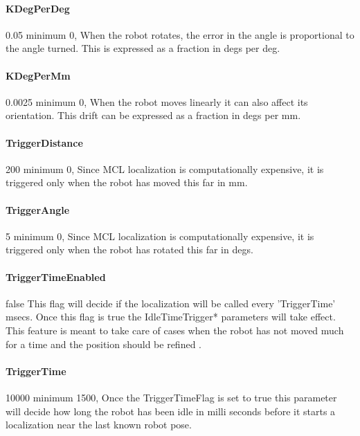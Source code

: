 \documentclass{article}
\begin{document}
\paragraph{KDegPerDeg}\label{KDegPerDegDoc} 0.05           minimum 0,  When the robot rotates, the error in the
                          angle is proportional to the angle turned. This is
                          expressed as a fraction in degs per deg.

\paragraph{KDegPerMm} 0.0025          minimum 0,  When the robot moves linearly it can
                          also affect its orientation. This drift can be
                          expressed as a fraction in degs per mm.

\paragraph{TriggerDistance} 200       minimum 0,  Since MCL localization is
                          computationally expensive, it is triggered only when
                          the robot has moved this far in mm.

\paragraph{TriggerAngle} 5            minimum 0,  Since MCL localization is
                          computationally expensive, it is triggered only when
                          the robot has rotated this far in degs.

\paragraph{TriggerTimeEnabled} false  This flag will decide if the localization will be
                          called every 'TriggerTime' msecs. Once this flag is
                          true the IdleTimeTrigger* parameters will take
                          effect. This feature is meant to take care of cases
                          when the robot has not moved much for a time and the
                          position should be refined .

\paragraph{TriggerTime} 10000         minimum 1500,  Once the TriggerTimeFlag is set to
                          true this parameter will decide how long the robot
                          has been idle in milli seconds before it starts a
                          localization near the last known robot pose.
\end{document}
